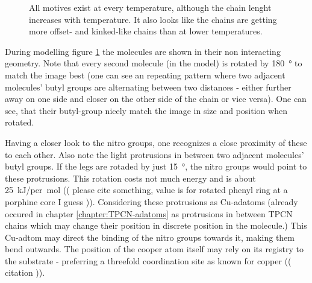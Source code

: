 \begin{figure}[h]
 \centering
\caption{All motives exist at every temperature, although the chain lenght increases with temperature. It also looks like the chains are getting more offset- and kinked-like chains than at lower temperatures.}
\label{fig:two-leg-trans-cu111-motivs}
\end{figure}

During modelling figure \ref{fig:two-leg-trans-cu111-motivs} the molecules are shown in their non interacting geometry. Note that every second molecule (in the model) is rotated by \SI{180}{\degree} to match the image best (one can see an repeating pattern where two adjacent molecules' butyl groups are alternating between two distances - either further away on one side and closer on the other side of the chain or vice versa). One can see, that their butyl-group nicely match the image in size and position when rotated. 

Having a closer look to the nitro groups, one recognizes a close proximity of these to each other. Also note the light protrusions in between two adjacent molecules' butyl groups. If the legs are rotaded by just \SI{15}{\degree}, the nitro groups would point to these protrusions. This rotation costs not much energy and is about \SI{25}{\kilo\J/per\mol} (( please cite something, value is for rotated phenyl ring at a porphine core I guess )). Considering these protrusions as Cu-adatoms (already occured in chapter \ref{chapter:TPCN-adatoms} as protrusions in between TPCN chains which may change their position in discrete position in the molecule.) This Cu-adtom may direct the binding of the nitro groups towards it, making them bend outwards. The position of the cooper atom itself may rely on its registry to the substrate - preferring a threefold coordination site as known for copper (( citation )).

